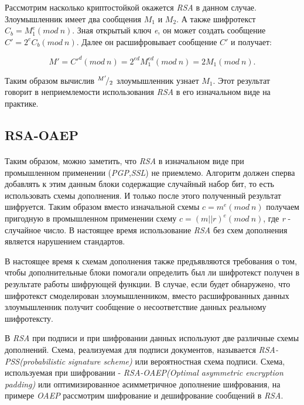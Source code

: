   Рассмотрим насколько криптостойкой окажется \textit{RSA} в данном случае. Злоумышленник имеет два сообщения {$M_1$} и 
  {$M_2$}. А также шифротекст {$C_{b}=M^{e}_{1}(mod \: n)$}. Зная открытый ключ \textit{e}, он может 
  создать сообщение {$C'=2^{e} C_{b}(mod \: n)$}. Далее он расшифровывает сообщение $C'$ и получает:

    \begin{equation}
      \textit{{$M'=C'^d(mod \: n)=2^{e d}M_{1}^{e d}(mod \: n)=2M_{1}(mod \: n).$}} 
    \end{equation}

  Таким образом вычислив {${}^{M'}\!/_{2}$} злоумышленник узнает {$M_1$}. Этот результат говорит в неприемлемости использования \textit{RSA} в его изначальном виде на практике.

\subsection{RSA-OAEP}

\paragraph{} Таким образом, можно заметить, что \textit{RSA} в изначальном виде при промышленном применении (\textit{PGP},\textit{SSL}) не приемлемо. Алгоритм должен сперва добавлять к этим данным блоки содержащие случайный набор бит, то есть использовать схемы дополнения. И только после этого полученный
  результат шифруется. Таким образом вместо изначальной схемы {$c=m^{e}(mod \: n)$} получаем пригодную в промышленном применении схему 
  {$c=(m||r)^{e}(mod \: n)$}, где \textit{r} - случайное число. В настоящее время использование
  \textit{RSA} без схем дополнения является нарушением стандартов.

  В настоящее время к схемам дополнения также предъявляются требования о том, чтобы дополнительные блоки помогали определить был ли шифротекст получен в результате работы 
  шифрующей функции. В случае, если будет обнаружено, что шифротекст смоделирован злоумышленником, вместо расшифрованных данных 
  злоумышленник получит сообщение о несоответствие данных реальному шифротексту.

  В \textit{RSA} при подписи и при шифровании данных используют две различные схемы дополнений. Схема, реализуемая для подписи документов, называется 
  \textit{RSA-PSS(probabilistic signature scheme)} или вероятностная схема подписи. Схема, используемая при шифровании - 
  \textit{RSA-OAEP(Optimal asymmetric encryption padding)} или оптимизированное асимметричное дополнение шифрования, на примере \textit{OAEP} рассмотрим 
  шифрование и дешифрование сообщений в \textit{RSA}.

